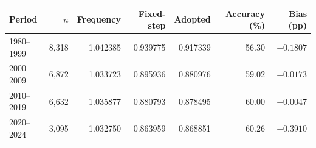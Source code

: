 \begin{tabular*}{\linewidth}{@{\extracolsep{\fill}}lrrrrrr@{}}
\toprule
Period & $n$ & Frequency & Fixed-step & Adopted & Accuracy (\%) & Bias (pp) \\
\midrule
1980--1999 & 8,318 & 1.042385 & 0.939775 & 0.917339 & 56.30 & $+0.1807$ \\
2000--2009 & 6,872 & 1.033723 & 0.895936 & 0.880976 & 59.02 & $-0.0173$ \\
2010--2019 & 6,632 & 1.035877 & 0.880793 & 0.878495 & 60.00 & $+0.0047$ \\
2020--2024 & 3,095 & 1.032750 & 0.863959 & 0.868851 & 60.26 & $-0.3910$ \\
\bottomrule
\end{tabular*}
